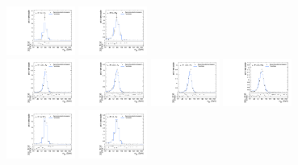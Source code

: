 \begin{figure}[htpb]
  \includegraphics[width=0.2\textwidth]{fig/analysisAppendix/templateVsReco_VBFRadToWW2000_r0_MJ_mu_HP_bb_HDy.pdf}
  \includegraphics[width=0.2\textwidth]{fig/analysisAppendix/templateVsReco_VBFRadToWW2000_r0_MJ_mu_LP_bb_HDy.pdf}\\
  \includegraphics[width=0.2\textwidth]{fig/analysisAppendix/templateVsReco_VBFRadToWW2000_r0_MJ_mu_HP_nobb_LDy.pdf}
  \includegraphics[width=0.2\textwidth]{fig/analysisAppendix/templateVsReco_VBFRadToWW2000_r0_MJ_mu_LP_nobb_LDy.pdf}
  \includegraphics[width=0.2\textwidth]{fig/analysisAppendix/templateVsReco_VBFRadToWW2000_r0_MJ_mu_HP_nobb_HDy.pdf}
  \includegraphics[width=0.2\textwidth]{fig/analysisAppendix/templateVsReco_VBFRadToWW2000_r0_MJ_mu_LP_nobb_HDy.pdf}\\
  \includegraphics[width=0.2\textwidth]{fig/analysisAppendix/templateVsReco_VBFRadToWW2000_r0_MJ_mu_HP_vbf_LDy.pdf}
  \includegraphics[width=0.2\textwidth]{fig/analysisAppendix/templateVsReco_VBFRadToWW2000_r0_MJ_mu_LP_vbf_LDy.pdf}

\end{figure}
